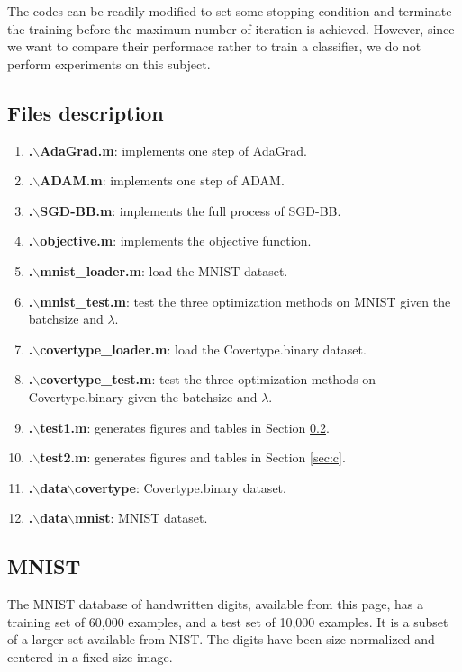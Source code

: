 \documentclass[conference,onecolumn,12pt]{IEEEtran}
\renewcommand{\(}{\left(}
\renewcommand{\)}{\right)}
\numberwithin{equation}{section}
\numberwithin{figure}{section}
\numberwithin{table}{section}
\theoremstyle{definition}
\begin{document}
The codes can be readily modified to set some stopping condition and terminate the training before the maximum number of iteration is achieved. However, since we want to compare their performace rather to train a classifier, we do not perform experiments on this subject.

\subsection{Files description}
\begin{enumerate}
\item {\bf .$\backslash$AdaGrad.m}: implements one step of AdaGrad.
\item {\bf .$\backslash$ADAM.m}: implements one step of ADAM.
\item {\bf .$\backslash$SGD-BB.m}: implements the full process of SGD-BB.
\item {\bf .$\backslash$objective.m}: implements the objective function.
\item {\bf .$\backslash$mnist\_loader.m}: load the MNIST dataset.
\item {\bf .$\backslash$mnist\_test.m}: test the three optimization methods on MNIST given the batchsize and $\lambda$.
\item {\bf .$\backslash$covertype\_loader.m}: load the Covertype.binary dataset.
\item {\bf .$\backslash$covertype\_test.m}: test the three optimization methods on Covertype.binary given the batchsize and $\lambda$.
\item {\bf .$\backslash$test1.m}: generates figures and tables in Section \ref{sec:m}.
\item {\bf .$\backslash$test2.m}: generates figures and tables in Section \ref{sec:c}.
\item {\bf .$\backslash$data$\backslash$covertype}: Covertype.binary dataset.
\item {\bf .$\backslash$data$\backslash$mnist}: MNIST dataset.
\end{enumerate}
\subsection{MNIST}\label{sec:m}
The MNIST database \cite{lecun1998gradient} of handwritten digits, available from this page, has a training set of 60,000 examples, and a test set of 10,000 examples. It is a subset of a larger set available from NIST. The digits have been size-normalized and centered in a fixed-size image. 
\end{document}
